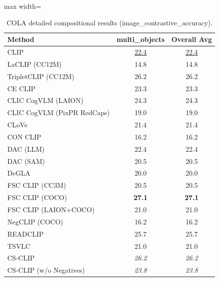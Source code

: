 \begin{table}[t]
  \centering
  \scriptsize
  \caption{COLA detailed compositional results (image_contrastive_accuracy).}
  \label{tab:COLA_detailed}
  \begin{adjustbox}{max width=\textwidth}
  \setlength{\tabcolsep}{2pt}
  \begin{tabular}{p{5cm}c|c}
    \toprule
    Method & multi\_objects & Overall Avg \\
    \midrule
    CLIP & \underline{22.4} & \underline{22.4} \\
    \midrule
    LaCLIP (CC12M) & 14.8 & 14.8 \\
    TripletCLIP (CC12M) & 26.2 & 26.2 \\
    \midrule
    CE CLIP & 23.3 & 23.3 \\
    CLIC CogVLM (LAION) & 24.3 & 24.3 \\
    CLIC CogVLM (PixPR RedCaps) & 19.0 & 19.0 \\
    CLoVe & 21.4 & 21.4 \\
    CON CLIP & 16.2 & 16.2 \\
    DAC (LLM) & 22.4 & 22.4 \\
    DAC (SAM) & 20.5 & 20.5 \\
    DeGLA & 20.0 & 20.0 \\
    FSC CLIP (CC3M) & 20.5 & 20.5 \\
    FSC CLIP (COCO) & \textbf{27.1} & \textbf{27.1} \\
    FSC CLIP (LAION+COCO) & 21.0 & 21.0 \\
    NegCLIP (COCO) & 16.2 & 16.2 \\
    READCLIP & 25.7 & 25.7 \\
    TSVLC & 21.0 & 21.0 \\
    \midrule
    CS-CLIP & \emph{26.2} & \emph{26.2} \\
    CS-CLIP (w/o Negatives) & \emph{23.8} & \emph{23.8} \\
    \bottomrule
  \end{tabular}
  \end{adjustbox}
\end{table}

